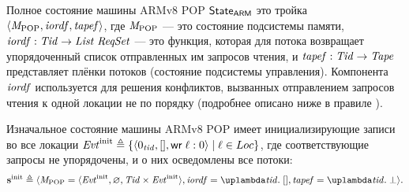 Полное состояние машины ARMv8 POP $\mathsf{State}_{\mathsf{ARM}}$ это тройка $\langle \mathit{M}_{\mathrm{POP}}, \mathit{iordf}, \mathit{tapef} \rangle$,
где $\mathit{M}_{\mathrm{POP}}$ --- это состояние подсистемы памяти,
$\mathit{iordf} : \mathit{Tid} \rightarrow \mathit{List}\;{\mathit{ReqSet}}$ --- это функция, которая
для потока возвращает упорядоченный список отправленных им запросов чтения, и
$\mathit{tapef} : \mathit{Tid} \rightarrow \mathit{Tape}$ представляет плёнки потоков (состояние подсистемы управления).
Компонента $\mathit{iordf}$ используется для решения конфликтов, вызванных
отправлением запросов чтения к одной локации не по порядку
(подробнее описано ниже в правиле ).

Изначальное состояние машины ARMv8 POP имеет инициализирующие записи во все локации
$\mathit{Evt}^{\rm init} \triangleq \{ \langle 0_{\mathit{tid}}, [], {\sf wr} \; \ell:0 \rangle \mid \ell \in Loc \}$,
где соответствующие запросы не упорядочены, и о них осведомлены все потоки:
\[
\sinit \triangleq
  \angled{\Mpop = \angled{\Evt^{\rm init}, \emptyset, \Tid \times \Evt^{\rm init}},
          \IssuingOrderf = \lambda \tId. \; [],
          \tapef = \lambda \tId. \; \bot}.
\]

